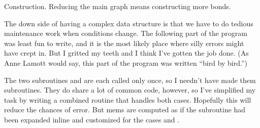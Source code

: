Construction. Reducing the main graph means constructing more bonds.

The down side of having a complex data structure is that
we have to do tedious maintenance work when conditions change. The following
part of the program was least fun to write, and it is the most likely
place where silly errors might have crept in. But I gritted my teeth
and I think I've gotten the job done. (As Anne Lamott would say,
this part of the program was written ``bird by bird.'')

The two subroutines  and  are each
called
only once, so I needn't have made them subroutines. They do share a
lot of common code, however, so I've simplified my task by writing
a combined routine that handles both cases. Hopefully this will reduce
the chances of error. But mems are computed as if the subroutine had
been expanded inline and customized for the cases  and .

